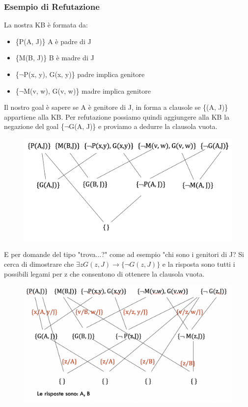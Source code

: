 \documentclass{article}
\begin{document}
\subsubsection{Esempio di Refutazione}
La nostra KB è formata da:
\begin{itemize}
    \item \{P(A, J)\} A è padre di J
    \item \{M(B, J)\} B è madre di J
    \item \{$\neg$P(x, y), G(x, y)\} padre implica genitore
    \item \{$\neg$M(v, w), G(v, w)\} madre implica genitore
\end{itemize} \clearpage
Il nostro goal è sapere se A è genitore di J, in forma a clausole se \{(A, J)\} appartiene alla KB. Per refutazione possiamo quindi aggiungere alla KB la negazione del goal \{$\neg$G(A, J)\} e proviamo a dedurre la clausola vuota.
\begin{figure}[H]
\centering
\includegraphics[scale=0.4]{Images/refutazioneesempio.png}
\end{figure}
E per domande del tipo "trova...?" come ad esempio "chi sono i genitori di J? \newline
Si cerca di dimostrare che $\exists z G(z,J) \rightarrow \{\neg G(z,J)\}$ e la risposta sono tutti i possibili legami per z che consentono di ottenere la clausola vuota.
\begin{figure}[H]
\centering
\includegraphics[scale=0.4]{Images/refutazioneesempio2.png}
\end{figure}
\end{document}
